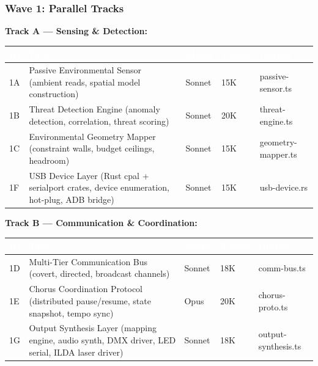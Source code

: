 \documentclass[11pt,letterpaper]{article}
\newcommand{\tableheader}[1]{\textbf{\sffamily\textcolor{white}{#1}}}
\begin{document}
\subsubsection{Wave 1: Parallel Tracks}

\textbf{Track A --- Sensing \& Detection:}

\begin{center}
\begin{tabularx}{\textwidth}{C{0.8cm}L{3.5cm}L{1.5cm}C{1.2cm}X}
\toprule
{}
\tableheader{ID} & \tableheader{Task} & \tableheader{Model} & \tableheader{Tokens} & \tableheader{Output} \\
\midrule
1A & Passive Environmental Sensor (ambient reads, spatial model construction) & Sonnet & 15K & passive-sensor.ts \\
1B & Threat Detection Engine (anomaly detection, correlation, threat scoring) & Sonnet & 20K & threat-engine.ts \\
1C & Environmental Geometry Mapper (constraint walls, budget ceilings, headroom) & Sonnet & 15K & geometry-mapper.ts \\
1F & USB Device Layer (Rust cpal + serialport crates, device enumeration, hot-plug, ADB bridge) & Sonnet & 15K & usb-device.rs \\
\bottomrule
\end{tabularx}
\end{center}

\textbf{Track B --- Communication \& Coordination:}

\begin{center}
\begin{tabularx}{\textwidth}{C{0.8cm}L{3.5cm}L{1.5cm}C{1.2cm}X}
\toprule
{}
\tableheader{ID} & \tableheader{Task} & \tableheader{Model} & \tableheader{Tokens} & \tableheader{Output} \\
\midrule
1D & Multi-Tier Communication Bus (covert, directed, broadcast channels) & Sonnet & 18K & comm-bus.ts \\
1E & Chorus Coordination Protocol (distributed pause/resume, state snapshot, tempo sync) & Opus & 20K & chorus-proto.ts \\
1G & Output Synthesis Layer (mapping engine, audio synth, DMX driver, LED serial, ILDA laser driver) & Sonnet & 18K & output-synthesis.ts \\
\bottomrule
\end{tabularx}
\end{center}
\end{document}
